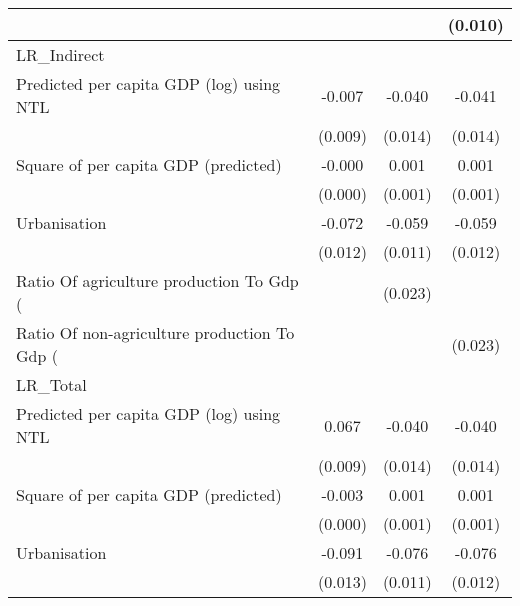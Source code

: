 {\begin{tabular}{l*{3}{c}}
                    &                     &                     &     (0.010)         \\
\hline
LR\_Indirect         &                     &                     &                     \\
Predicted per capita GDP (log) using NTL&      -0.007         &      -0.040\sym{***}&      -0.041\sym{***}\\
                    &     (0.009)         &     (0.014)         &     (0.014)         \\
[1em]
Square of per capita GDP (predicted)&      -0.000         &       0.001         &       0.001         \\
                    &     (0.000)         &     (0.001)         &     (0.001)         \\
[1em]
Urbanisation        &      -0.072\sym{***}&      -0.059\sym{***}&      -0.059\sym{***}\\
                    &     (0.012)         &     (0.011)         &     (0.012)         \\
[1em]
Ratio Of agriculture production To Gdp (%
                    &                     &     (0.023)         &                     \\
[1em]
Ratio Of non-agriculture production To Gdp (%
                    &                     &                     &     (0.023)         \\
\hline
LR\_Total            &                     &                     &                     \\
Predicted per capita GDP (log) using NTL&       0.067\sym{***}&      -0.040\sym{***}&      -0.040\sym{***}\\
                    &     (0.009)         &     (0.014)         &     (0.014)         \\
[1em]
Square of per capita GDP (predicted)&      -0.003\sym{***}&       0.001\sym{*}  &       0.001\sym{*}  \\
                    &     (0.000)         &     (0.001)         &     (0.001)         \\
[1em]
Urbanisation        &      -0.091\sym{***}&      -0.076\sym{***}&      -0.076\sym{***}\\
                    &     (0.013)         &     (0.011)         &     (0.012)         \\

\end{tabular}}
